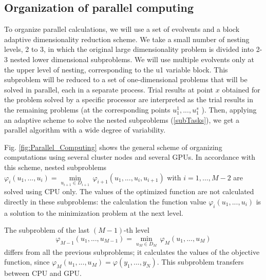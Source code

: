 \documentclass{svproc}
\begin{document}
\subsection{Organization of parallel computing}

To organize parallel calculations, we will use a set of evolvents and a block adaptive dimensionality reduction scheme. We take a small number of nesting levels, 2 to 3, in which the original large dimensionality problem is divided into 2-3 nested lower dimensional subproblems. We will use multiple evolvents only at the upper level of nesting, corresponding to the u1 variable block. This subproblem will be reduced to a set of one-dimensional problems that will be solved in parallel, each in a separate process. Trial results at point $x$ obtained for the problem solved by a specific processor are interpreted as the trial results in the remaining problems (at the corresponding points \(u^1_1,..., u^s_1\) ).
Then, applying an adaptive scheme to solve the nested subproblems (\ref{subTasks}), we get a parallel algorithm with a wide degree of variability.

Fig. \ref{fig:Parallel_Computing} shows the general scheme of organizing computations using several cluster nodes and several GPUs. In accordance with this scheme, nested subproblems  ${{\varphi }_{i}}({{u}_{1}},...,{{u}_{i}})=\underset{{{u}_{i+1}}\in {{D}_{i+1}}}{\mathop{\min }}\,{{\varphi }_{i+1}}({{u}_{1}},...,{{u}_{i}},{{u}_{i+1}})$  with \(i=1,\ldots ,M-2\) are solved using CPU only. The values of the optimized function are not calculated directly in these subproblems: the calculation the function value  ${{\varphi }_{i}}({{u}_{1}},...,{{u}_{i}})$ is a solution to the minimization problem at the next level.

The subproblem of the last \((M - 1)\)-th level 
\[
{{\varphi }_{M-1}}({{u}_{1}},...,{{u}_{M-1}})=\underset{{{u}_{M}}\in {{D}_{M}}}{\mathop{\min }}\,{{\varphi }_{M}}({{u}_{1}},...,{{u}_{M}})
\]
 differs from all the previous subproblems; it calculates the values of the objective function, since ${{\varphi }_{M}}({{u}_{1}},...,{{u}_{M}})=\varphi ({{y}_{1}},...,{{y}_{N}})$. This subproblem transfers between CPU and GPU.
\end{document}
